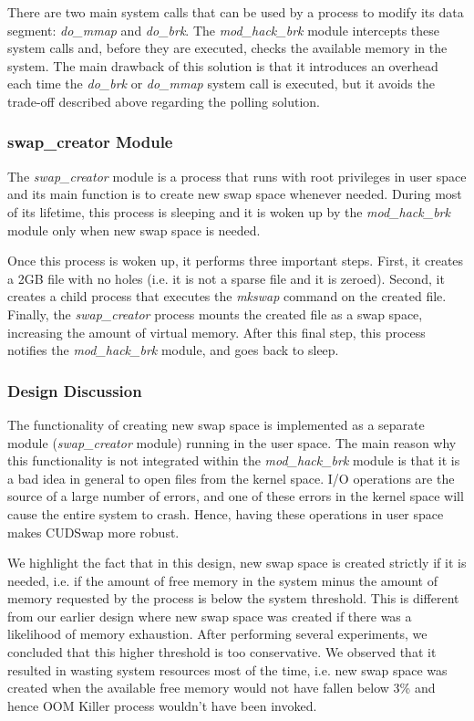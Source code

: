 There are two main system calls that can be used by a process to modify its
data segment: {\it do\_mmap} and {\it do\_brk}.
The {\it mod\_hack\_brk} module intercepts these system calls and, before they
are executed, checks the available memory in the system. The main drawback
of this solution is that it introduces an overhead each time the
{\it do\_brk} or {\it do\_mmap} system call is executed, but it avoids the
trade-off described above regarding the polling solution.

\subsubsection{swap\_creator Module}

The {\it swap\_creator} module is a process that runs with root privileges
in user space and its main function is to create new swap space whenever
needed. During most of its lifetime, this process is sleeping and it is
woken up by the {\it mod\_hack\_brk} module only when new swap space is
needed.

Once this process is woken up, it performs three important steps. First,
it creates a 2GB file with no holes (i.e. it is not a sparse file and it
is zeroed). Second, it creates a child process that executes the
{\it mkswap} command on the created file. Finally, the {\it swap\_creator}
process mounts the created file as a swap space, increasing the amount of
virtual memory. After this final step, this process notifies the
{\it mod\_hack\_brk} module, and goes back to sleep.

\subsubsection{Design Discussion}

The functionality of creating new swap space is implemented as a
separate module ({\it swap\_creator} module) running in the user space.
The main reason why this functionality is not integrated within the
{\it mod\_hack\_brk} module is that it is a bad idea in general to open
files from the kernel space. I/O operations are the source of a large
number of errors, and one of these errors in the kernel space will cause
the entire system to crash. Hence, having these operations in user space
makes CUDSwap more robust.

We highlight the fact that in this design, new swap space is created
strictly if it is needed, i.e. if the amount of free memory in the system
minus the amount of memory requested by the process is below the system
threshold. This is different from our earlier design \cite{Molina2013dcdv}
where new swap space was created if there was a likelihood of memory
exhaustion. After performing several experiments, we concluded that
this higher threshold is too conservative. We observed that it
resulted in wasting system resources most of the time, i.e. new swap
space was created when the available free memory would not have fallen
below 3\% and hence OOM Killer process wouldn't have been invoked.

